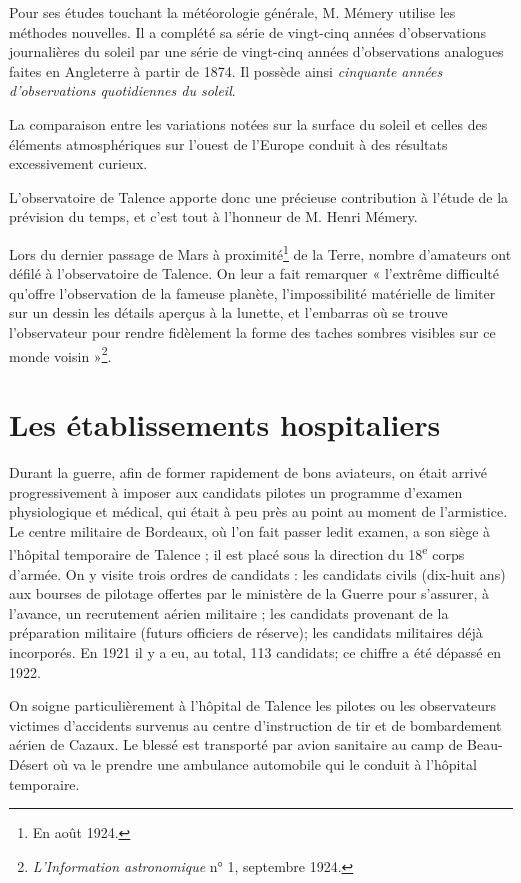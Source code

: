 \documentclass[a4paper,11pt]{book}
\begin{document}
Pour ses études touchant la météorologie générale, M. Mémery utilise les méthodes nouvelles. Il a complété sa série de vingt-cinq années d'observations journalières du soleil par une série de vingt-cinq années d'observations analogues faites en Angleterre à partir de 1874. Il possède ainsi \textit{cinquante années d'observations quotidiennes du soleil}.

La comparaison entre les variations notées sur la surface du soleil et celles des éléments atmosphériques sur l'ouest de l'Europe conduit à des résultats excessivement
curieux.

L'observatoire de Talence apporte donc une précieuse contribution à l'étude de la prévision du temps, et c'est tout à l'honneur de M. Henri Mémery.

Lors du dernier passage de Mars à proximité\footnote{En août 1924.} de la Terre, nombre d'amateurs ont défilé à l'observatoire de Talence. On leur a fait remarquer « l'extrême difficulté qu'offre l'observation de la fameuse planète, l'impossibilité matérielle de limiter sur un dessin les détails aperçus à la lunette, et l'embarras où se trouve l'observateur pour rendre fidèlement la forme des taches sombres visibles sur ce monde voisin »\footnote{\textit{L'Information astronomique} n° 1, septembre 1924.}.

\section{Les établissements hospitaliers}

Durant la guerre, afin de former rapidement de bons aviateurs, on était arrivé progressivement à imposer aux candidats pilotes un programme d'examen physiologique et médical, qui était à peu près au point au moment de l'armistice. Le centre militaire de Bordeaux, où l'on fait passer ledit examen, a son siège à l'hôpital temporaire de Talence ; il est placé sous la direction du 18\textsuperscript{e} corps d'armée. On y visite trois ordres de candidats : les candidats civils (dix-huit ans) aux bourses de pilotage offertes par le ministère de la Guerre pour s'assurer, à l'avance, un recrutement aérien militaire ; les candidats provenant de la préparation militaire (futurs officiers de réserve); les candidats militaires déjà incorporés. En 1921 il y a eu, au total, 113 candidats; ce chiffre a été dépassé en 1922.

On soigne particulièrement à l'hôpital de Talence les pilotes ou les observateurs victimes d'accidents survenus au centre d'instruction de tir et de bombardement aérien de Cazaux. Le blessé est transporté par avion sanitaire au camp de Beau-Désert où va le prendre une ambulance automobile qui le conduit à l'hôpital temporaire.
\end{document}
